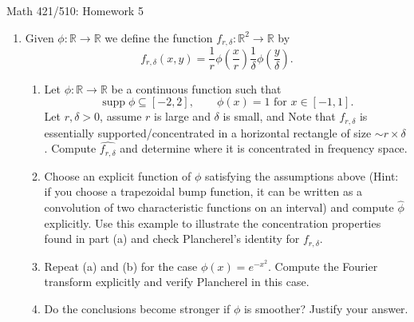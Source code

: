 \documentclass[11pt]{article}
\begin{document}
\begin{center}
    {\LARGE Math 421/510: Homework 5}
\end{center}

\vspace{1.5em}

\begin{enumerate}[leftmargin=2em, label=\arabic*.]
    \item Given $\phi:\mathbb{R}\to\mathbb{R}$ we define the function $f_{r,\delta}:\mathbb{R}^2\to\mathbb{R}$ by
    \[
    f_{r,\delta}(x,y)=\frac{1}{r}\phi\!\left(\frac{x}{r}\right)\frac{1}{\delta}\phi\!\left(\frac{y}{\delta}\right).
    \]

    \begin{enumerate}[label=(\alph*), leftmargin=2em]
        \item Let $\phi:\mathbb{R}\to\mathbb{R}$ be a continuous function such that
        \[
        \operatorname{supp}\phi \subseteq [-2,2], \qquad \phi(x)=1 \text{ for } x\in[-1,1].
        \]
        Let $r,\delta>0$, assume $r$ is large and $\delta$ is small, and Note that $f_{r,\delta}$ is essentially supported/concentrated in a horizontal rectangle of size $\sim r\times \delta$. Compute $\widehat{f_{r,\delta}}$ and determine where it is concentrated in frequency space.

        \item Choose an explicit function of $\phi$ satisfying the assumptions above (Hint: if you choose a trapezoidal bump function, it can be written as a convolution of two characteristic functions on an interval) and compute $\widehat{\phi}$ explicitly. Use this example to illustrate the concentration properties found in part (a) and check Plancherel's identity for $f_{r,\delta}$.

        \item Repeat (a) and (b) for the case $\phi(x)=e^{-x^2}$. Compute the Fourier transform explicitly and verify Plancherel in this case.

        \item Do the conclusions become stronger if $\phi$ is smoother? Justify your answer.
    \end{enumerate}


\end{enumerate}
\end{document}
